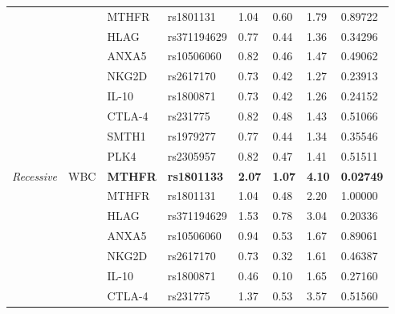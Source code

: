 \begin{table}[!ht]
\begin{tabular}{llllllll}
 &                      & MTHFR          & rs1801131          & 1.04          & 0.60  & 1.79          & 0.89722          \\ \cline{3-8} 
 &                      & HLAG           & rs371194629        & 0.77          & 0.44  & 1.36          & 0.34296          \\ \cline{3-8} 
&                      & ANXA5          & rs10506060         & 0.82          & 0.46   & 1.47          & 0.49062          \\ \cline{3-8} 
 &                      & NKG2D          & rs2617170          & 0.73          & 0.42  & 1.27          & 0.23913          \\ \cline{3-8} 
 &                      & IL-10          & rs1800871          & 0.73          & 0.42  & 1.26          & 0.24152          \\ \cline{3-8} 
 &                      & CTLA-4         & rs231775           & 0.82          & 0.48  & 1.43          & 0.51066          \\ \cline{3-8} 
 &                      & SMTH1          & rs1979277          & 0.77          & 0.44  & 1.34          & 0.35546          \\ \cline{3-8} 
 &   & PLK4           & rs2305957          & 0.82          & 0.47          & 1.41     & 0.51511          \\ \hline
 \multirow{9}{*}{\textit{Recessive}} &
  \multirow{9}{*}{WBC} &
  \textbf{MTHFR} &
  \textbf{rs1801133} &
  \textbf{2.07} &
  \textbf{1.07} &
  \textbf{4.10} &
  \textbf{0.02749} \\ \cline{3-8} 
 &   & MTHFR          & rs1801131          & 1.04          & 0.48          & 2.20    & 1.00000          \\ \cline{3-8} 
  &                      & HLAG           & rs371194629        & 1.53          & 0.78  & 3.04          & 0.20336 \\ \cline{3-8}  &   & ANXA5          & rs10506060         & 0.94          & 0.53          & 1.67 & 0.89061          \\ \cline{3-8} 
 &                      & NKG2D          & rs2617170          & 0.73          & 0.32 & 1.61          & 0.46387          \\ \cline{3-8} 
&   & IL-10          & rs1800871          & 0.46          & 0.10          & 1.65          & 0.27160          \\ \cline{3-8} 
 &                      & CTLA-4         & rs231775           & 1.37          & 0.53  & 3.57          & 0.51560          \\ \cline{3-8} 

\end{tabular}
\end{table}
